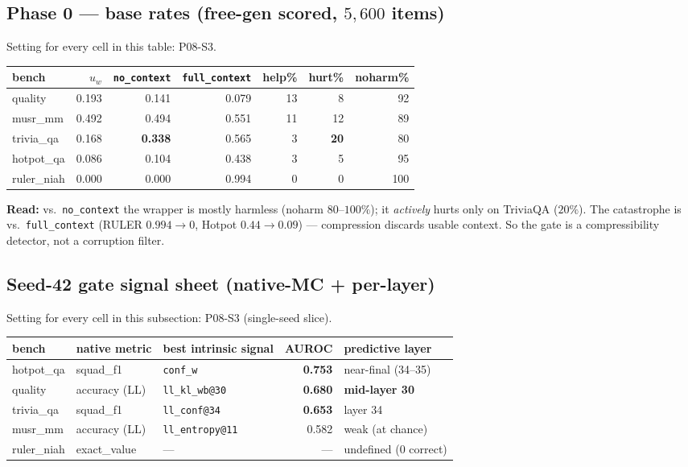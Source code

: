 \documentclass[11pt]{article}
\newcommand{\noctx}{\texttt{no\_context}}
\newcommand{\fullctx}{\texttt{full\_context}}
\newcommand{\code}[1]{\texttt{#1}}
\begin{document}
\subsection{Phase 0 --- base rates (free-gen scored, $5{,}600$ items)}
\label{sec:phase0}
Setting for every cell in this table: P08-S3.
\begin{center}\small
\begin{tabular}{l rrr rrr}
\toprule
bench & $u_w$ & \noctx{} & \fullctx{} & help\% & hurt\% & noharm\%\\
\midrule
quality    & 0.193 & 0.141 & 0.079 & 13 & 8  & 92\\
musr\_mm   & 0.492 & 0.494 & 0.551 & 11 & 12 & 89\\
trivia\_qa & 0.168 & \textbf{0.338} & 0.565 & 3 & \textbf{20} & 80\\
hotpot\_qa & 0.086 & 0.104 & 0.438 & 3 & 5  & 95\\
ruler\_niah& 0.000 & 0.000 & 0.994 & 0 & 0  & 100\\
\bottomrule
\end{tabular}
\end{center}
\noindent\textbf{Read:} vs.\ \noctx{} the wrapper is mostly harmless
(noharm $80$--$100\%$); it \emph{actively} hurts only on TriviaQA
($20\%$). The catastrophe is vs.\ \fullctx{} (RULER $0.994\!\to\!0$,
Hotpot $0.44\!\to\!0.09$) --- compression discards usable context. So
the gate is a compressibility detector, not a corruption filter.

\subsection{Seed-42 gate signal sheet (native-MC + per-layer)}
\label{sec:seed42}
Setting for every cell in this subsection: P08-S3 (single-seed slice).
\begin{center}\small
\begin{tabular}{l l l r l}
\toprule
bench & native metric & best intrinsic signal & AUROC & predictive layer\\
\midrule
hotpot\_qa & squad\_f1        & \code{conf\_w}        & \textbf{0.753} & near-final (34--35)\\
quality    & accuracy (LL)    & \code{ll\_kl\_wb@30}  & \textbf{0.680} & \textbf{mid-layer 30}\\
trivia\_qa & squad\_f1        & \code{ll\_conf@34}    & \textbf{0.653} & layer 34\\
musr\_mm   & accuracy (LL)    & \code{ll\_entropy@11} & 0.582          & weak (at chance)\\
ruler\_niah& exact\_value     & ---                   & ---            & undefined ($0$ correct)\\
\bottomrule
\end{tabular}
\end{center}
\end{document}
